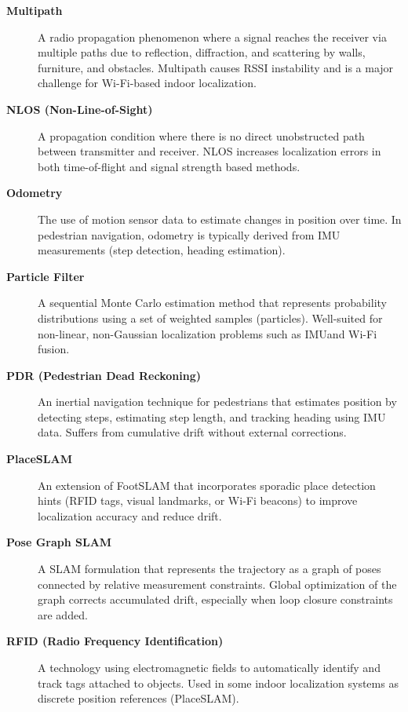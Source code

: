 \documentclass{ipgpmaster}
\begin{document}
\begin{description}
\item[\textbf{Multipath}]
A radio propagation phenomenon where a signal reaches the receiver via multiple paths due to reflection, diffraction, and scattering by walls, furniture, and obstacles. Multipath causes RSSI instability and is a major challenge for Wi-Fi-based indoor localization.

\item[\textbf{NLOS (Non-Line-of-Sight)}]
A propagation condition where there is no direct unobstructed path between transmitter and receiver. NLOS increases localization errors in both time-of-flight and signal strength based methods.

\item[\textbf{Odometry}]
The use of motion sensor data to estimate changes in position over time. In pedestrian navigation, odometry is typically derived from IMU measurements (step detection, heading estimation).

\item[\textbf{Particle Filter}]
A sequential Monte Carlo estimation method that represents probability distributions using a set of weighted samples (particles). Well-suited for non-linear, non-Gaussian localization problems such as IMUand  Wi-Fi fusion.

\item[\textbf{PDR (Pedestrian Dead Reckoning)}]
An inertial navigation technique for pedestrians that estimates position by detecting steps, estimating step length, and tracking heading using IMU data. Suffers from cumulative drift without external corrections.

\item[\textbf{PlaceSLAM}]
An extension of FootSLAM that incorporates sporadic place detection hints (RFID tags, visual landmarks, or Wi-Fi beacons) to improve localization accuracy and reduce drift.

\item[\textbf{Pose Graph SLAM}]
A SLAM formulation that represents the trajectory as a graph of poses connected by relative measurement constraints. Global optimization of the graph corrects accumulated drift, especially when loop closure constraints are added.

\item[\textbf{RFID (Radio Frequency Identification)}]
A technology using electromagnetic fields to automatically identify and track tags attached to objects. Used in some indoor localization systems as discrete position references (PlaceSLAM).


\end{description}
\end{document}
